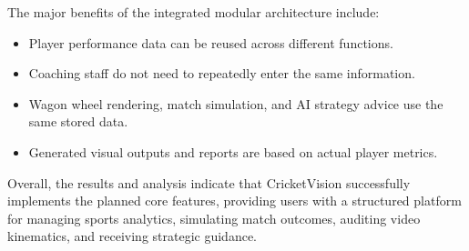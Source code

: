 The major benefits of the integrated modular architecture include:
\begin{itemize}
    \item Player performance data can be reused across different functions.
    \item Coaching staff do not need to repeatedly enter the same information.
    \item Wagon wheel rendering, match simulation, and AI strategy advice use the same stored data.
    \item Generated visual outputs and reports are based on actual player metrics.
\end{itemize}

Overall, the results and analysis indicate that CricketVision successfully implements the planned core features, providing users with a structured platform for managing sports analytics, simulating match outcomes, auditing video kinematics, and receiving strategic guidance.
